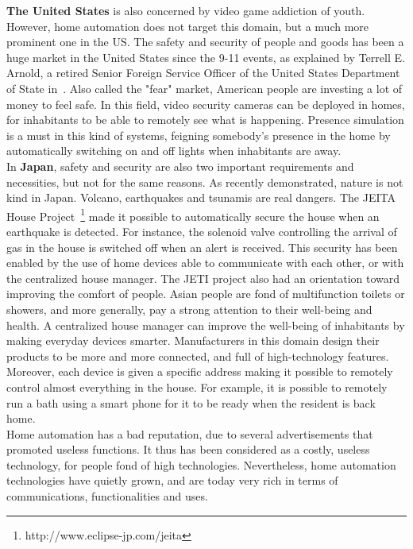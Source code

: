 {\bf The United States} is also concerned by video game addiction of youth. However, home automation does not target this domain, but a much more prominent one in the US. The safety and security of people and goods has been a huge market in the United States since the 9-11 events, as explained by Terrell E. Arnold, a retired Senior Foreign Service Officer of the United States Department of State in~\cite{Arnold:2011}. Also called the "fear" market, American people are investing a lot of money to feel safe. In this field, video security cameras can be deployed in homes, for inhabitants to be able to remotely see what is happening. Presence simulation is a must in this kind of systems, feigning somebody's presence in the home by automatically switching on and off lights when inhabitants are away.\\

In {\bf Japan}, safety and security are also two important requirements and necessities, but not for the same reasons. As recently demonstrated, nature is not kind in Japan. Volcano, earthquakes and tsunamis are real dangers. The JEITA House Project~\footnote{http://www.eclipse-jp.com/jeita} made it possible to automatically secure the house when an earthquake is detected. For instance, the solenoid valve controlling the arrival of gas in the house is switched off when an alert is received. This security has been enabled by the use of home devices able to communicate with each other, or with the centralized house manager. The JETI project also had an orientation toward improving the comfort of people. Asian people are fond of multifunction toilets or showers, and more generally, pay a strong attention to their well-being and health. A centralized house manager can improve the well-being of inhabitants by making everyday devices smarter. Manufacturers in this domain design their products to be more and more connected, and full of high-technology features. Moreover, each device is given a specific address making it possible to remotely control almost everything in the house. For example, it is possible to remotely run a bath using a smart phone for it to be ready when the resident is back home.\\

Home automation has a bad reputation, due to several advertisements that promoted useless functions. It thus has been considered as a costly, useless technology, for people fond of high technologies. Nevertheless, home automation technologies have quietly grown, and are today very rich in terms of communications, functionalities and uses.


